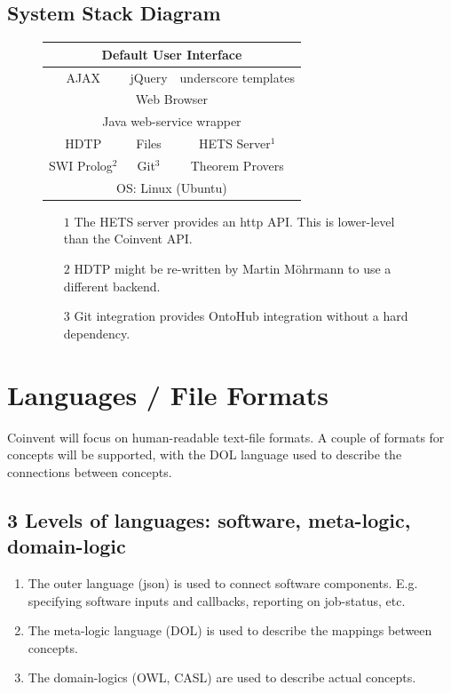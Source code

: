 \subsection{System Stack Diagram}

\begin{figure}[!h]
\begin{center}
\begin{tabular}{|c|c|c|}
\hline
\multicolumn{3}{|c|}{Default User Interface}\\
\hline
AJAX&jQuery&underscore templates\\
\hline
\multicolumn{3}{|c|}{Web Browser}\\
\hline
\multicolumn{3}{|c|}{Java web-service wrapper}\\
\hline
HDTP&Files&HETS Server$^1$\\
\hline
SWI Prolog$^2$&Git$^3$&Theorem Provers\\
\hline
\multicolumn{3}{|c|}{OS: Linux (Ubuntu)}\\
\hline
\end{tabular}
\end{center}
\begin{footnotesize}
\begin{itemize}
\item[$1$]{The HETS server provides an http API. This is lower-level than the Coinvent API.}
\item[$2$]{HDTP might be re-written by Martin Möhrmann to use a different backend.}
\item[$3$]{Git integration provides OntoHub integration without a hard dependency.}
\end{itemize}
\end{footnotesize}
\end{figure}

\section{Languages / File Formats}\label{sec:languages}

Coinvent will focus on human-readable text-file formats. 
A couple of formats for concepts will be supported, with the DOL language used to describe the connections between concepts.
\subsection{3 Levels of languages: software, meta-logic, domain-logic}
\begin{enumerate}
\item The outer language (json) is used to connect software components. E.g. specifying software inputs and callbacks, reporting on job-status, etc.
\item The meta-logic language (DOL) is used to describe the mappings between concepts.
\item The domain-logics (OWL, CASL) are used to describe actual concepts.
\end{enumerate}


